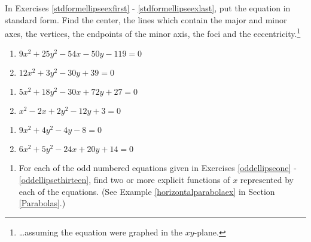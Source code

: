 In Exercises \ref{stdformellipseexfirst} - \ref{stdformellipseexlast}, put the equation in standard form.   Find the center, the lines which contain the major and minor axes, the vertices, the endpoints of the minor axis, the foci and the eccentricity.\footnote{\ldots assuming the equation were graphed in the $xy$-plane.}

\begin{multicols}{2}
\begin{enumerate}
\setcounter{enumi}{\value{HW}}

\item $9x^2+25y^2-54x-50y-119=0$  \label{stdformellipseexfirst}   \label{oddellipsenine}
\item $12x^{2} + 3y^{2} - 30y + 39 = 0$

\setcounter{HW}{\value{enumi}}
\end{enumerate}
\end{multicols}

\begin{multicols}{2}
\begin{enumerate}
\setcounter{enumi}{\value{HW}}

\item $5x^{2} + 18y^{2} - 30x + 72y + 27 = 0$   \label{oddellipseeleven}
\item $x^2 - 2x + 2y^2 - 12y + 3 = 0$


\setcounter{HW}{\value{enumi}}
\end{enumerate}
\end{multicols}

\begin{multicols}{2}
\begin{enumerate}
\setcounter{enumi}{\value{HW}}

\item $9x^2 + 4y^2 - 4y - 8 = 0$   \label{oddellipsethirteen}
\item $6x^2+5y^2-24x+20y+14=0$  \label{stdformellipseexlast}

\setcounter{HW}{\value{enumi}}
\end{enumerate}
\end{multicols}

\begin{enumerate}
\setcounter{enumi}{\value{HW}}

\item For each of the odd numbered equations given in Exercises \ref{oddellipseone} - \ref{oddellipsethirteen}, find two or more explicit functions of $x$ represented by each of the equations.  (See Example \ref{horizontalparabolaex} in Section \ref{Parabolas}.)

\setcounter{HW}{\value{enumi}}
\end{enumerate}

